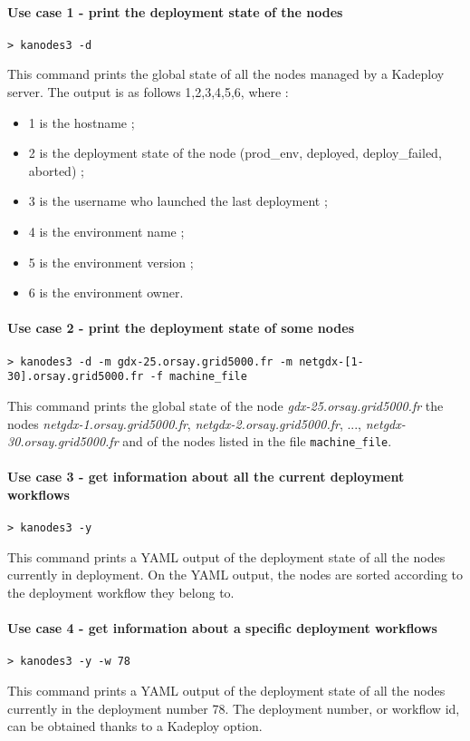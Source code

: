 \documentclass[a4wide,10pt,oneside]{book}
\begin{document}
\paragraph{Use case 1 - print the deployment state of the nodes}
\begin{verbatim}
> kanodes3 -d
\end{verbatim}
This command prints the global state of all the nodes managed by a Kadeploy server. The output is as follows 1,2,3,4,5,6, where :
\begin{itemize}
\item 1 is the hostname ;
\item 2 is the deployment state of the node (prod\_env, deployed, deploy\_failed, aborted) ;
\item 3 is the username who launched the last deployment ;
\item 4 is the environment name ;
\item 5 is the environment version ;
\item 6 is the environment owner.
\end{itemize}

\paragraph{Use case 2 - print the deployment state of some nodes}
\begin{verbatim}
> kanodes3 -d -m gdx-25.orsay.grid5000.fr -m netgdx-[1-30].orsay.grid5000.fr -f machine_file
\end{verbatim}
This command prints the global state of the node \textit{gdx-25.orsay.grid5000.fr} the nodes \textit{netgdx-1.orsay.grid5000.fr}, \textit{netgdx-2.orsay.grid5000.fr}, ..., \textit{netgdx-30.orsay.grid5000.fr} and of the nodes listed in the file \texttt{machine\_file}.

\paragraph{Use case 3 - get information about all the current deployment workflows}
\begin{verbatim}
> kanodes3 -y
\end{verbatim}
This command prints a YAML output of the deployment state of all the nodes currently in deployment. On the YAML output, the nodes are sorted according to the deployment workflow they belong to.

\paragraph{Use case 4 - get information about a specific deployment workflows}
\begin{verbatim}
> kanodes3 -y -w 78
\end{verbatim}
This command prints a YAML output of the deployment state of all the nodes currently in the deployment number 78. The deployment number, or workflow id, can be obtained thanks to a Kadeploy option.
\end{document}
